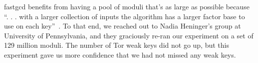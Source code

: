 fastgcd benefits from having a pool of moduli that's as large as possible because 
``. . . with a larger collection of inputs the algorithm has a larger 
factor base to use on each key''~\cite{Heninger2012a}.  
To that end, we reached out to Nadia Heninger's group at University of Pennsylvania, 
and they graciously re-ran our experiment on a set of 129 million 
moduli. The number of Tor weak keys did not go up, but 
this experiment gave us more confidence that we had not missed any weak keys.
